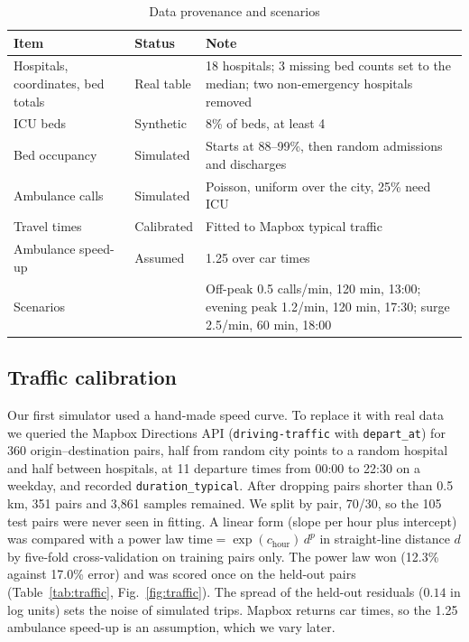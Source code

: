 \documentclass[conference]{IEEEtran}
\begin{document}
\begin{table}[t]
\caption{Data provenance and scenarios}
\label{tab:data}
\centering\scriptsize
\begin{tabular}{p{2.1cm}p{1.2cm}p{4.2cm}}
\toprule
Item & Status & Note \\
\midrule
Hospitals, coordinates, bed totals & Real table & 18 hospitals; 3 missing bed counts set to the median; two non-emergency hospitals removed \\
ICU beds & Synthetic & 8\% of beds, at least 4 \\
Bed occupancy & Simulated & Starts at 88--99\%, then random admissions and discharges \\
Ambulance calls & Simulated & Poisson, uniform over the city, 25\% need ICU \\
Travel times & Calibrated & Fitted to Mapbox typical traffic \\
Ambulance speed-up & Assumed & 1.25 over car times \\
\midrule
Scenarios & & Off-peak 0.5 calls/min, 120 min, 13:00; evening peak 1.2/min, 120 min, 17:30; surge 2.5/min, 60 min, 18:00 \\
\bottomrule
\end{tabular}
\end{table}

\subsection{Traffic calibration}
\label{sec:traffic}
Our first simulator used a hand-made speed curve. To replace it with real data we queried the Mapbox Directions API (\texttt{driving-traffic} with \texttt{depart\_at}) for 360 origin--destination pairs, half from random city points to a random hospital and half between hospitals, at 11 departure times from 00:00 to 22:30 on a weekday, and recorded \texttt{duration\_typical}. After dropping pairs shorter than 0.5\,km, 351 pairs and 3,861 samples remained. We split by pair, 70/30, so the 105 test pairs were never seen in fitting. A linear form (slope per hour plus intercept) was compared with a power law $\text{time}=\exp(c_{\text{hour}})\,d^{p}$ in straight-line distance $d$ by five-fold cross-validation on training pairs only. The power law won (12.3\% against 17.0\% error) and was scored once on the held-out pairs (Table~\ref{tab:traffic}, Fig.~\ref{fig:traffic}). The spread of the held-out residuals ($0.14$ in log units) sets the noise of simulated trips. Mapbox returns car times, so the 1.25 ambulance speed-up is an assumption, which we vary later.
\end{document}
